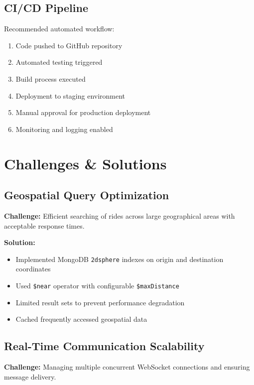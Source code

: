 \documentclass[12pt,a4paper]{article}
\begin{document}
\subsection{CI/CD Pipeline}

Recommended automated workflow:
\begin{enumerate}
    \item Code pushed to GitHub repository
    \item Automated testing triggered
    \item Build process executed
    \item Deployment to staging environment
    \item Manual approval for production deployment
    \item Monitoring and logging enabled
\end{enumerate}

\newpage

\section{Challenges \& Solutions}

\subsection{Geospatial Query Optimization}

\textbf{Challenge:} Efficient searching of rides across large geographical areas with acceptable response times.

\textbf{Solution:} 
\begin{itemize}
    \item Implemented MongoDB \texttt{2dsphere} indexes on origin and destination coordinates
    \item Used \texttt{\$near} operator with configurable \texttt{\$maxDistance}
    \item Limited result sets to prevent performance degradation
    \item Cached frequently accessed geospatial data
\end{itemize}

\subsection{Real-Time Communication Scalability}

\textbf{Challenge:} Managing multiple concurrent WebSocket connections and ensuring message delivery.
\end{document}
